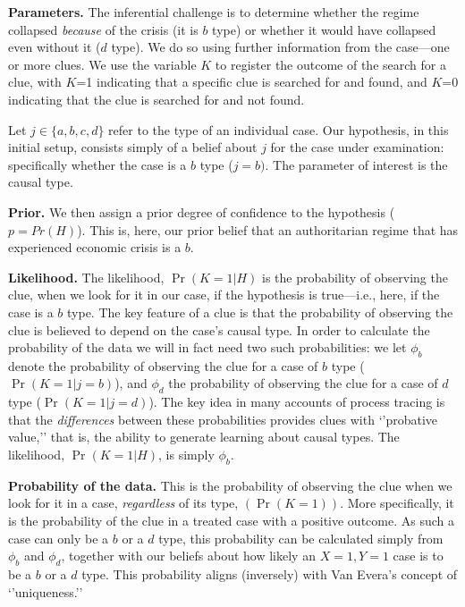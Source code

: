 \documentclass[
  12pt,
]{book}
\begin{document}
\textbf{Parameters.} The inferential challenge is to determine whether the regime collapsed \emph{because} of the crisis (it is \(b\) type) or whether it would have collapsed even without it (\(d\) type). We do so using further information from the case---one or more clues. We use the variable \(K\) to register the outcome of the search for a clue, with \(K\)=1 indicating that a specific clue is searched for and found, and \(K\)=0 indicating that the clue is searched for and not found.

Let \(j\in \{a,b,c,d\}\) refer to the type of an individual case. Our hypothesis, in this initial setup, consists simply of a belief about \(j\) for the case under examination: specifically whether the case is a \(b\) type (\(j=b)\). The parameter of interest is the causal type.

\textbf{Prior.} We then assign a prior degree of confidence to the hypothesis (\(p = Pr(H)\)). This is, here, our prior belief that an authoritarian regime that has experienced economic crisis is a \(b\).

\textbf{Likelihood.} The likelihood, \(\Pr(K=1|H)\) is the probability of observing the clue, when we look for it in our case, if the hypothesis is true---i.e., here, if the case is a \(b\) type. The key feature of a clue is that the probability of observing the clue is believed to depend on the case's causal type. In order to calculate the probability of the data we will in fact need two such probabilities: we let \(\phi_b\) denote the probability of observing the clue for a case of \(b\) type (\(\Pr(K=1|j=b)\)), and \(\phi_d\) the probability of observing the clue for a case of \(d\) type (\(\Pr(K=1|j=d)\)). The key idea in many accounts of process tracing is that the \emph{differences} between these probabilities provides clues with `'probative value,'' that is, the ability to generate learning about causal types. The likelihood, \(\Pr(K=1|H)\), is simply \(\phi_b\).

\textbf{Probability of the data.} This is the probability of observing the clue when we look for it in a case, \emph{regardless} of its type, \((\Pr(K=1))\). More specifically, it is the probability of the clue in a treated case with a positive outcome. As such a case can only be a \(b\) or a \(d\) type, this probability can be calculated simply from \(\phi_b\) and \(\phi_d\), together with our beliefs about how likely an \(X=1, Y=1\) case is to be a \(b\) or a \(d\) type.
This probability aligns (inversely) with Van Evera's concept of `'uniqueness.''
\end{document}
